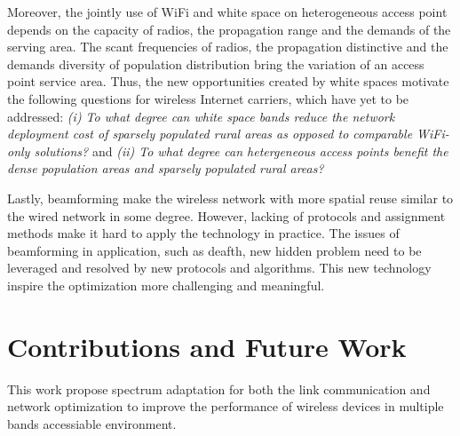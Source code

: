 Moreover, the jointly use of WiFi and white space on heterogeneous 
access point depends on the capacity of radios, the propagation range 
and the demands of the serving area. The scant frequencies of radios, 
the propagation distinctive and the demands diversity of population 
distribution bring the variation of an access point service area. 
Thus, the new opportunities created by white spaces motivate the following 
questions for wireless Internet carriers, which have yet to be addressed: 
{\it (i) To what degree can white space bands reduce the network deployment 
cost of sparsely populated rural areas as opposed to comparable WiFi-only 
solutions?} and {\it (ii) To what degree can hetergeneous access points 
benefit the dense population areas and sparsely populated rural areas?}

Lastly, beamforming make the wireless network with more spatial reuse 
similar to the wired network in some degree. However, lacking of protocols 
and assignment methods make it hard to apply the technology in practice. 
The issues of beamforming in application, such as deafth, new hidden 
problem need to be leveraged and resolved by new protocols and algorithms. 
This new technology inspire the optimization more challenging and meaningful.

\section{Contributions and Future Work}

This work propose spectrum adaptation for both the link communication and 
network optimization to improve the performance of wireless devices in 
multiple bands accessiable environment.

